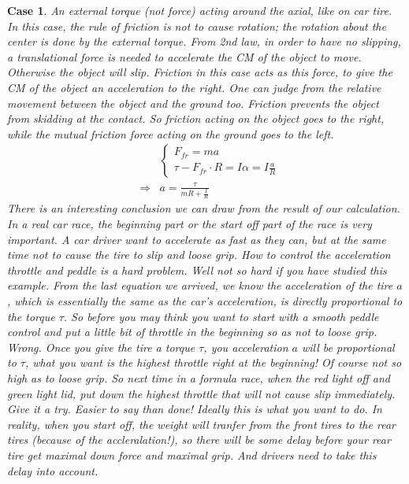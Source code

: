 \documentclass{article}
\newtheorem{case}[theorem]{Case}
\begin{document}
\newpage

\begin{case}
An external torque (not force) acting around the axial, like on car tire.%
\newline
\newline
In this case, the rule of friction is not to cause rotation; the rotation
about the center is done by the external torque. From 2nd law, in order to
have no slipping, a translational force is needed to accelerate the CM of
the object to move. Otherwise the object will slip. Friction in this case
acts as this \emph{force}, to give the CM of the object an acceleration to
the right. One can judge from the relative movement between the object and
the ground too. Friction prevents the object from skidding at the contact.
So friction acting on the object goes to the right, while the mutual
friction force acting on the ground goes to the left.%
\begin{eqnarray*}
&&\left\{ 
\begin{array}{c}
F_{fr}=ma \\ 
\tau -F_{fr}\cdot R=I\alpha =I\frac{a}{R}%
\end{array}%
\right.  \\
&\Rightarrow &a=\frac{\tau }{mR+\frac{I}{R}}
\end{eqnarray*}%
\newline
There is an interesting conclusion we can draw from the result of our
calculation. In a real car race, the beginning part or the start off part of
the race is very important. A car driver want to accelerate as fast as they
can, but at the same time not to cause the tire to slip and loose grip. How
to control the acceleration throttle and peddle is a hard problem. Well not
so hard if you have studied this example. From the last equation we arrived,
we know the acceleration of the tire $a$, which is essentially the same as
the car's acceleration, is directly proportional to the torque $\tau $. So
before you may think you want to start with a smooth peddle control and put
a little bit of throttle in the beginning so as not to loose grip. Wrong.
Once you give the tire a torque $\tau $, you acceleration $a$ will be
proportional to $\tau $, what you want is the highest throttle right at the
beginning! Of course not so high as to loose grip. So next time in a formula
race, when the red light off and green light lid, put down the highest
throttle that will not cause slip immediately. Give it a try. Easier to say
than done! Ideally this is what you want to do. In reality, when you start
off, the weight will tranfer from the front tires to the rear tires (because
of the accleralation!), so there will be some delay before your rear tire
get maximal down force and maximal grip. And drivers need to take this delay
into account.
\end{case}
\end{document}
